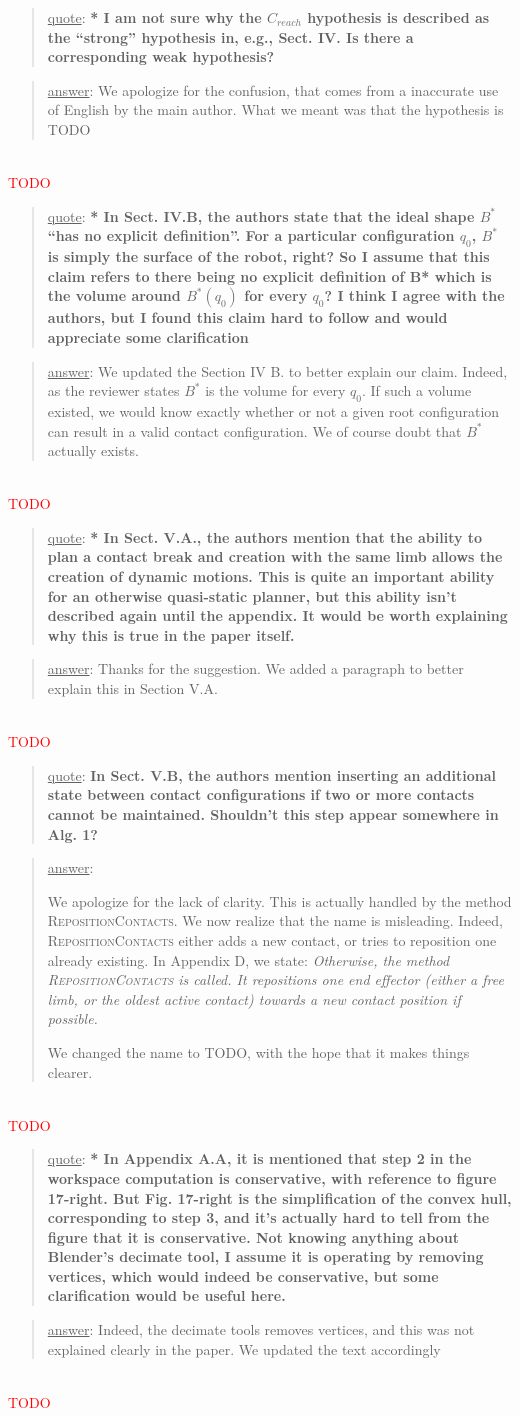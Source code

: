 \documentclass[a4paper]{article}
\newcommand{\ndone}[0]{\textcolor{red}{TODO}}
\newcommand\quot[1]{\begin{quote} \underline{quote}: \textbf{#1}\end{quote}}
\newcommand\as[1]{\begin{quote} \underline{answer}: {#1}\end{quote} \leavevmode \\ }
\begin{document}
\quot{* I am not sure why the $C_{reach}$ hypothesis is described as the ``strong''
hypothesis in, e.g., Sect. IV. Is there a corresponding weak
hypothesis?}
\as{We apologize for the confusion, that comes from a inaccurate use of English by the main author. What we meant was that the hypothesis is TODO}\ndone

\quot{* In Sect. IV.B, the authors state that the ideal shape $B^*$ ``has no
explicit definition''. For a particular configuration  $q_0$, $B^*$ is simply
the surface of the robot, right? So I assume that this claim refers to
there being no explicit definition of B* which is the volume around
$B^*(q_0)$ for every $q_0$? I think I agree with the authors, but I found
this claim hard to follow and would appreciate some clarification}
\as{We updated the Section IV B. to better explain our claim. Indeed, as the reviewer states $B^*$  is the volume for every $q_0$. If such a volume existed, we would know exactly whether or not a given root configuration can result in a valid contact configuration.
We of course doubt that $B^*$ actually exists. }\ndone

\quot{* In Sect. V.A., the authors mention that the ability to plan a contact
break and creation with the same limb allows the creation of dynamic
motions. This is quite an important ability for an otherwise
quasi-static planner, but this ability isn't described again until the
appendix. It would be worth explaining why this is true in the paper
itself. }
\as{Thanks for the suggestion. We added a paragraph to better explain this in Section V.A.}\ndone

\quot{In Sect. V.B, the authors mention inserting an additional state
between contact configurations if two or more contacts cannot be
maintained. Shouldn't this step appear somewhere in Alg. 1?}
\as{We apologize for the lack of clarity. This is actually handled by the method \textsc{RepositionContacts}. We now realize that the name is misleading. Indeed,
\textsc{RepositionContacts} either adds a new contact, or tries to reposition one already existing. In Appendix D, we state:
\textit{Otherwise, the method \textsc{RepositionContacts} is called. It repositions one end effector (either a free
limb, or the oldest active contact) towards a new contact
position if possible. }

We changed the name to \textsc{TODO}, with the hope that it makes things clearer.}\ndone

\quot{* In Appendix A.A, it is mentioned that step 2 in the workspace
computation is conservative, with reference to figure 17-right. But
Fig. 17-right is the simplification of the convex hull, corresponding
to step 3, and it's actually hard to tell from the figure that it is
conservative. Not knowing anything about Blender's decimate tool, I
assume it is operating by removing vertices, which would indeed be
conservative, but some clarification would be useful here.}
\as{Indeed, the decimate tools removes vertices, and this was not explained clearly in the paper. We updated the text accordingly}\ndone
\end{document}
